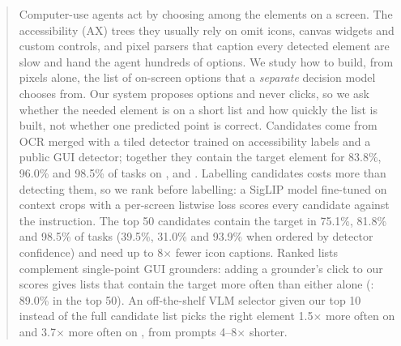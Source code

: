 \begin{abstract}
Computer-use agents act by choosing among the elements on a screen. The accessibility (AX) trees they usually
rely on omit icons, canvas widgets and custom controls, and pixel parsers that caption every detected element are
slow and hand the agent hundreds of options. We study how to build, from pixels alone, the list of on-screen options
that a \emph{separate} decision model chooses from. Our system proposes options and never clicks, so we ask whether
the needed element is on a short list and how quickly the list is built, not whether one predicted point is
correct. Candidates come from OCR merged with a tiled detector trained on accessibility labels and a public GUI
detector; together they contain the target element for 83.8\%, 96.0\% and 98.5\% of tasks on \osw, \sspro and
\ssv. Labelling candidates costs more than detecting them, so we rank before labelling: a SigLIP model fine-tuned
on context crops with a per-screen listwise loss scores every candidate against the instruction. The top 50
candidates contain the target in 75.1\%, 81.8\% and 98.5\% of tasks (39.5\%, 31.0\% and 93.9\% when ordered by
detector confidence) and need up to 8$\times$ fewer icon captions. Ranked lists complement single-point GUI
grounders: adding a grounder's click to our scores gives lists that contain the target more often than either
alone (\sspro: 89.0\% in the top 50). An off-the-shelf VLM selector given our top 10 instead of the full candidate
list picks the right element 1.5$\times$ more often on \osw and 3.7$\times$ more often on \sspro, from prompts
4--8$\times$ shorter.
\end{abstract}
